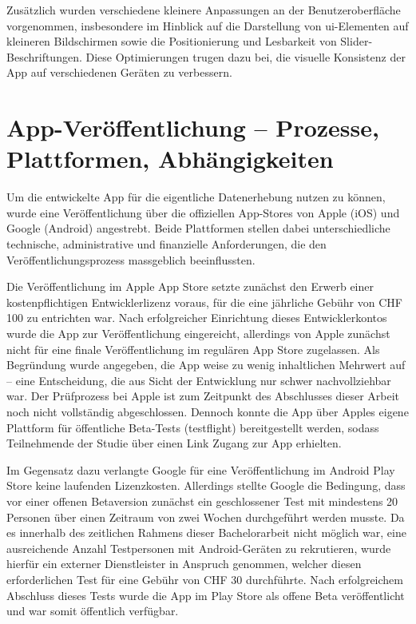 Zusätzlich wurden verschiedene kleinere Anpassungen an der Benutzeroberfläche vorgenommen, insbesondere im Hinblick auf die Darstellung von \gls{ui}-Elementen auf kleineren Bildschirmen sowie die Positionierung und Lesbarkeit von Slider-Beschriftungen. Diese Optimierungen trugen dazu bei, die visuelle Konsistenz der App auf verschiedenen Geräten zu verbessern.

\section{App-Veröffentlichung -- Prozesse, Plattformen, Abhängigkeiten}

Um die entwickelte App für die eigentliche Datenerhebung nutzen zu können, wurde eine Veröffentlichung über die offiziellen App-Stores von Apple (iOS) und Google (Android) angestrebt. Beide Plattformen stellen dabei unterschiedliche technische, administrative und finanzielle Anforderungen, die den Veröffentlichungsprozess massgeblich beeinflussten.

Die Veröffentlichung im Apple App Store setzte zunächst den Erwerb einer kostenpflichtigen Entwicklerlizenz voraus, für die eine jährliche Gebühr von CHF 100 zu entrichten war. Nach erfolgreicher Einrichtung dieses Entwicklerkontos wurde die App zur Veröffentlichung eingereicht, allerdings von Apple zunächst nicht für eine finale Veröffentlichung im regulären App Store zugelassen. Als Begründung wurde angegeben, die App weise zu wenig inhaltlichen Mehrwert auf -- eine Entscheidung, die aus Sicht der Entwicklung nur schwer nachvollziehbar war. Der Prüfprozess bei Apple ist zum Zeitpunkt des Abschlusses dieser Arbeit noch nicht vollständig abgeschlossen. Dennoch konnte die App über Apples eigene Plattform für öffentliche Beta-Tests (\gls{testflight}) bereitgestellt werden, sodass Teilnehmende der Studie über einen Link Zugang zur App erhielten.

Im Gegensatz dazu verlangte Google für eine Veröffentlichung im Android Play Store keine laufenden Lizenzkosten. Allerdings stellte Google die Bedingung, dass vor einer offenen Betaversion zunächst ein geschlossener Test mit mindestens 20 Personen über einen Zeitraum von zwei Wochen durchgeführt werden musste. Da es innerhalb des zeitlichen Rahmens dieser Bachelorarbeit nicht möglich war, eine ausreichende Anzahl Testpersonen mit Android-Geräten zu rekrutieren, wurde hierfür ein externer Dienstleister in Anspruch genommen, welcher diesen erforderlichen Test für eine Gebühr von CHF 30 durchführte. Nach erfolgreichem Abschluss dieses Tests wurde die App im Play Store als offene Beta veröffentlicht und war somit öffentlich verfügbar.

